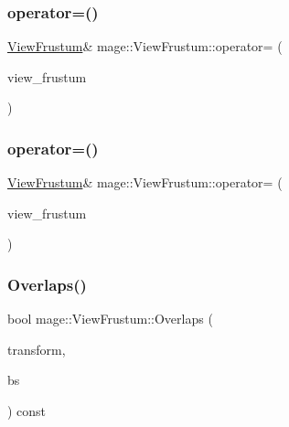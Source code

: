 \hypertarget{classmage_1_1_view_frustum_add514821f691117c0ab139c13f86ef70}{}\label{classmage_1_1_view_frustum_add514821f691117c0ab139c13f86ef70} 
\subsubsection{\texorpdfstring{operator=()}{operator=()}\hspace{0.1cm}{\footnotesize\ttfamily [1/2]}}
{\footnotesize\ttfamily \hyperlink{classmage_1_1_view_frustum}{View\+Frustum}\& mage\+::\+View\+Frustum\+::operator= (\begin{DoxyParamCaption}\item[{const \hyperlink{classmage_1_1_view_frustum}{View\+Frustum} \&}]{view\+\_\+frustum }\end{DoxyParamCaption})\hspace{0.3cm}{\ttfamily [default]}}

\hypertarget{classmage_1_1_view_frustum_a0167f34c3ba505155ed6064c6d98a99c}{}\label{classmage_1_1_view_frustum_a0167f34c3ba505155ed6064c6d98a99c} 
\subsubsection{\texorpdfstring{operator=()}{operator=()}\hspace{0.1cm}{\footnotesize\ttfamily [2/2]}}
{\footnotesize\ttfamily \hyperlink{classmage_1_1_view_frustum}{View\+Frustum}\& mage\+::\+View\+Frustum\+::operator= (\begin{DoxyParamCaption}\item[{\hyperlink{classmage_1_1_view_frustum}{View\+Frustum} \&\&}]{view\+\_\+frustum }\end{DoxyParamCaption})\hspace{0.3cm}{\ttfamily [default]}}

\hypertarget{classmage_1_1_view_frustum_ab45ef542b3bacf16390a8f223472bcd5}{}\label{classmage_1_1_view_frustum_ab45ef542b3bacf16390a8f223472bcd5} 
\subsubsection{\texorpdfstring{Overlaps()}{Overlaps()}\hspace{0.1cm}{\footnotesize\ttfamily [1/2]}}
{\footnotesize\ttfamily bool mage\+::\+View\+Frustum\+::\+Overlaps (\begin{DoxyParamCaption}\item[{const Transform \&}]{transform,  }\item[{const \hyperlink{structmage_1_1_b_s}{BS} \&}]{bs }\end{DoxyParamCaption}) const}

